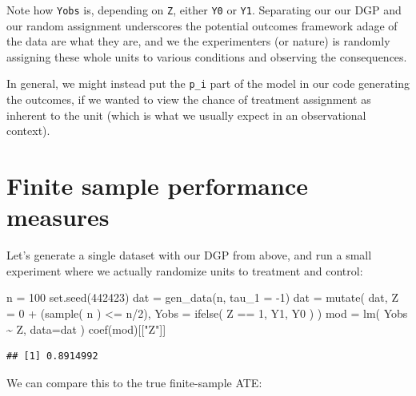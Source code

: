 \documentclass[
]{book}
\newenvironment{Shaded}{\begin{snugshade}}{\end{snugshade}}
\newcommand{\AttributeTok}[1]{\textcolor[rgb]{0.77,0.63,0.00}{#1}}
\newcommand{\DecValTok}[1]{\textcolor[rgb]{0.00,0.00,0.81}{#1}}
\newcommand{\FunctionTok}[1]{\textcolor[rgb]{0.00,0.00,0.00}{#1}}
\newcommand{\NormalTok}[1]{#1}
\newcommand{\OtherTok}[1]{\textcolor[rgb]{0.56,0.35,0.01}{#1}}
\newcommand{\SpecialCharTok}[1]{\textcolor[rgb]{0.00,0.00,0.00}{#1}}
\newcommand{\StringTok}[1]{\textcolor[rgb]{0.31,0.60,0.02}{#1}}
\begin{document}
Note how \texttt{Yobs} is, depending on \texttt{Z}, either \texttt{Y0} or \texttt{Y1}.
Separating our our DGP and our random assignment underscores the potential outcomes framework adage of the data are what they are, and we the experimenters (or nature) is randomly assigning these whole units to various conditions and observing the consequences.

In general, we might instead put the \texttt{p\_i} part of the model in our code generating the outcomes, if we wanted to view the chance of treatment assignment as inherent to the unit (which is what we usually expect in an observational context).

\hypertarget{finite-sample-performance-measures}{%
\section{Finite sample performance measures}\label{finite-sample-performance-measures}}

Let's generate a single dataset with our DGP from above, and run a small experiment where we actually randomize units to treatment and control:

\begin{Shaded}
\begin{Highlighting}[]
\NormalTok{n }\OtherTok{=} \DecValTok{100}
\FunctionTok{set.seed}\NormalTok{(}\DecValTok{442423}\NormalTok{)}
\NormalTok{dat }\OtherTok{=} \FunctionTok{gen\_data}\NormalTok{(n, }\AttributeTok{tau\_1 =} \SpecialCharTok{{-}}\DecValTok{1}\NormalTok{)}
\NormalTok{dat }\OtherTok{=} \FunctionTok{mutate}\NormalTok{( dat,}
              \AttributeTok{Z =} \DecValTok{0} \SpecialCharTok{+}\NormalTok{ (}\FunctionTok{sample}\NormalTok{( n ) }\SpecialCharTok{\textless{}=}\NormalTok{ n}\SpecialCharTok{/}\DecValTok{2}\NormalTok{),}
              \AttributeTok{Yobs =} \FunctionTok{ifelse}\NormalTok{( Z }\SpecialCharTok{==} \DecValTok{1}\NormalTok{, Y1, Y0 ) )}
\NormalTok{mod }\OtherTok{=} \FunctionTok{lm}\NormalTok{( Yobs }\SpecialCharTok{\textasciitilde{}}\NormalTok{ Z, }\AttributeTok{data=}\NormalTok{dat )}
\FunctionTok{coef}\NormalTok{(mod)[[}\StringTok{"Z"}\NormalTok{]]}
\end{Highlighting}
\end{Shaded}

\begin{verbatim}
## [1] 0.8914992
\end{verbatim}

We can compare this to the true finite-sample ATE:
\end{document}
